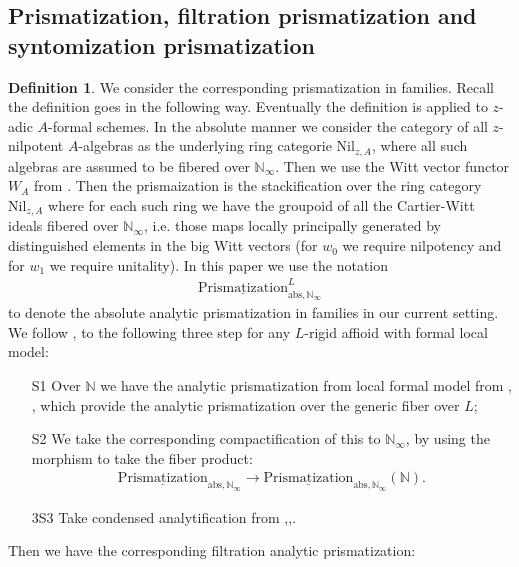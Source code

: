 \documentclass[12pt]{article}
\theoremstyle{definition}
\newtheorem{definition}{Definition}
\begin{document}
\subsection{Prismatization, filtration prismatization and syntomization prismatization}

\begin{definition}
We consider the corresponding prismatization in families. Recall the definition goes in the following way. Eventually the definition is applied to $z$-adic $A$-formal schemes. In the absolute manner we consider the category of all $z$-nilpotent $A$-algebras as the underlying ring categorie $\mathrm{Nil}_{z,A}$, where all such algebras are assumed to be fibered over $\mathbb{N}_\infty$. Then we use the Witt vector functor $W_A$ from \cite{3LH}. Then the prismaization is the stackification over the ring category $\mathrm{Nil}_{z,A}$ where for each such ring we have the groupoid of all the Cartier-Witt ideals fibered over $\mathbb{N}_\infty$, i.e. those maps locally principally generated by distinguished elements in the big Witt vectors (for $w_0$ we require nilpotency and for $w_1$ we require unitality). In this paper we use the notation 
\begin{align}
\underline{\mathrm{Prismatization}}^L_{\mathrm{abs},\mathbb{N}_\infty}
\end{align}
to denote the absolute analytic prismatization in families in our current setting. We follow \cite{3S1}, \cite{3ALBRCS} to the following three step for any $L$-rigid affioid with formal local model:
\begin{itemize}
\item[S1] Over $\mathbb{N}$ we have the analytic prismatization from local formal model from \cite{3S1}, \cite{3ALBRCS}, which provide the analytic prismatization over the generic fiber over $L$;
\item[S2] We take the corresponding compactification of this to $\mathbb{N}_\infty$, by using the morphism to take the fiber product:
\begin{align}
\underline{\mathrm{Prismatization}}_{\mathrm{abs},\mathbb{N}_\infty}\rightarrow \underline{\mathrm{Prismatization}}_{\mathrm{abs},\mathbb{N}_\infty}(\mathbb{N}).
\end{align}
\item[3S3] Take condensed analytification from \cite{3CS},\cite{3CS1},\cite{3CS2}.
\end{itemize}
Then we have the corresponding filtration analytic  prismatization:
\begin{align}

\end{align}
\end{definition}
\end{document}
